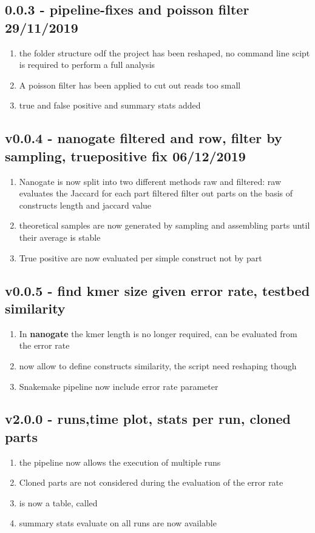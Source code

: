 \documentclass[11pt, a4paper]{article}
\begin{document}
\subsection{0.0.3 - pipeline-fixes and poisson filter 29/11/2019}
\begin{enumerate}
\item the folder structure odf the project has been reshaped, no command line scipt is required to perform a
full analysis
\item A poisson filter has been applied to cut out reads too small
\item true and false positive and summary stats added
\end{enumerate}

\subsection{v0.0.4 - nanogate filtered and row, filter by sampling, truepositive fix 06/12/2019}
\begin{enumerate}
\item Nanogate is now split into two different methods raw and filtered:
 raw evaluates the Jaccard for each part
 filtered filter out parts on the basis of constructs length and jaccard value
\item theoretical samples are now generated by sampling and assembling parts until their average is stable
\item True positive are now evaluated per simple construct not by part
\end{enumerate}

\subsection{v0.0.5 - find kmer size given error rate, testbed similarity}
\begin{enumerate}
\item In \textbf{nanogate} the kmer length is no longer required, can be evaluated from the error rate
\item {} now allow to define constructs similarity, the script need reshaping though
\item Snakemake pipeline now include error rate parameter
\end{enumerate}

\subsection{v2.0.0 - runs,time plot, stats per run, cloned parts}
\begin{enumerate}
\item the pipeline now allows the execution of multiple runs
\item Cloned parts are not considered during the evaluation of the error rate
\item {} is now a table, called 
\item summary stats evaluate on all runs are now available
\end{enumerate}
\end{document}
